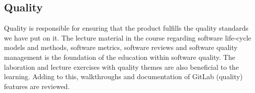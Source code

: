 \subsection{Quality}
Quality is responsible for ensuring that the product fulfills the quality standards we have put on it. The lecture material in the course regarding software life-cycle models and methods, software metrics, software reviews and software quality management is the foundation of the education within software quality. The laboration and lecture exercises with quality themes are also beneficial to the learning. Adding to this, walkthroughs and documentation of GitLab (quality) features are reviewed.



